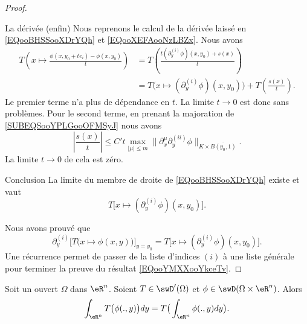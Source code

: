 \begin{proof}
\begin{subproof}
\begin{itemize}
            \end{itemize}
        \item[La dérivée (enfin)]
            Nous reprenons le calcul de la dérivée laissé en \eqref{EQooBHSSooXDrYQh} et \eqref{EQooXEFAooNzLBZx}. Nous avons
            \begin{subequations}
                \begin{align}
                    T\left( x\mapsto\frac{ \phi(x,y_0+te_i)-\phi(x,y_0) }{ t } \right)&=T\left( \frac{ t(\partial_y^{(i)}\phi)(x,y_0)+s(x) }{ t }\right)\\
                    &=T\Big( x\mapsto (\partial_y^{(i)}\phi)(x,y_0) \Big)+T\left( \frac{ s(x) }{ t } \right).
                \end{align}
            \end{subequations}
            Le premier terme n'a plus de dépendance en \( t\). La limite \( t\to 0\) est donc sans problèmes. Pour le second terme, en prenant la majoration de \eqref{SUBEQSooYPLGooOFMSyJ} nous avons
            \begin{equation}
                | \frac{ s(x) }{ t } |\leq C't\max_{| \mu |\leq m}\| \partial_x^{\mu}\partial_y^{(ii)}\phi \|_{K\times \overline{ B(y_0,1) }}.
            \end{equation}
            La limite \( t\to 0\) de cela est zéro.
        \item[Conclusion]
            La limite du membre de droite de \eqref{EQooBHSSooXDrYQh} existe et vaut
            \begin{equation}
                T\Big[x\mapsto (\partial_y^{(i)}\phi)(x,y_0) \Big].
            \end{equation}
    \end{subproof}
    Nous avons prouvé que
    \begin{equation}
        \partial^{(i)}_y\Big[ T\big( x\mapsto\phi(x,y) \big) \Big]_{y=y_0}=T\Big[ x\mapsto (\partial^{(i)}_y\phi)(x,y_0) \Big].
    \end{equation}
    Une récurrence permet de passer de la liste d'indices \( (i)\) à une liste générale pour terminer la preuve du résultat \eqref{EQooYMXXooYkceTv}.
\end{proof}

\begin{theorem}
    Soit un ouvert \( \Omega\) dans \( \eR^n\). Soient \( T\in \swD'(\Omega)\) et \( \phi\in \swD(\Omega\times \eR^n)\). Alors
    \begin{equation}
        \int_{\eR^n}T\big( \phi(.,y) \big)dy=T\big( \int_{\eR^n}\phi(.,y)dy \big).
    \end{equation}
\end{theorem}

